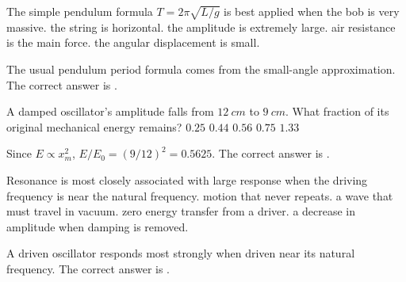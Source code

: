 \documentclass[full,print,11pt,a4paper]{physicsquiz}
\begin{document}
\begin{quizbank}
  \begin{quizquestion}[
    id=ow-pendulum-010,
    topic=pendulums,
    difficulty=foundation,
    marks=1,
    correct=E,
    tags={small-angle},
    outcome={State the condition for pendulum SHM}
  ]
    The simple pendulum formula \(T=2\pi\sqrt{L/g}\) is best applied when
    \choices
      {the bob is very massive.}
      {the string is horizontal.}
      {the amplitude is extremely large.}
      {air resistance is the main force.}
      {the angular displacement is small.}
  \end{quizquestion}
  \begin{quizsolution}
    The usual pendulum period formula comes from the small-angle approximation.
    The correct answer is \quizcorrectletter.
  \end{quizsolution}

  \begin{quizquestion}[
    id=ow-damping-011,
    topic=damped-oscillations,
    difficulty=applied,
    marks=1,
    correct=C,
    tags={damping,energy},
    outcome={Relate amplitude decay to energy decay}
  ]
    A damped oscillator's amplitude falls from \(\SI{12}{cm}\) to
    \(\SI{9}{cm}\). What fraction of its original mechanical energy remains?
    \choices
      {\(0.25\)}
      {\(0.44\)}
      {\(0.56\)}
      {\(0.75\)}
      {\(1.33\)}
  \end{quizquestion}
  \begin{quizsolution}
    Since \(E\propto x_m^2\), \(E/E_0=(9/12)^2=0.5625\). The correct answer is
    \quizcorrectletter.
  \end{quizsolution}

  \begin{quizquestion}[
    id=ow-resonance-012,
    topic=forced-oscillations,
    difficulty=foundation,
    marks=1,
    correct=A,
    tags={resonance},
    outcome={Explain resonance}
  ]
    Resonance is most closely associated with
    \choices
      {large response when the driving frequency is near the natural frequency.}
      {motion that never repeats.}
      {a wave that must travel in vacuum.}
      {zero energy transfer from a driver.}
      {a decrease in amplitude when damping is removed.}
  \end{quizquestion}
  \begin{quizsolution}
    A driven oscillator responds most strongly when driven near its natural
    frequency. The correct answer is \quizcorrectletter.
  \end{quizsolution}


\end{quizbank}
\end{document}
